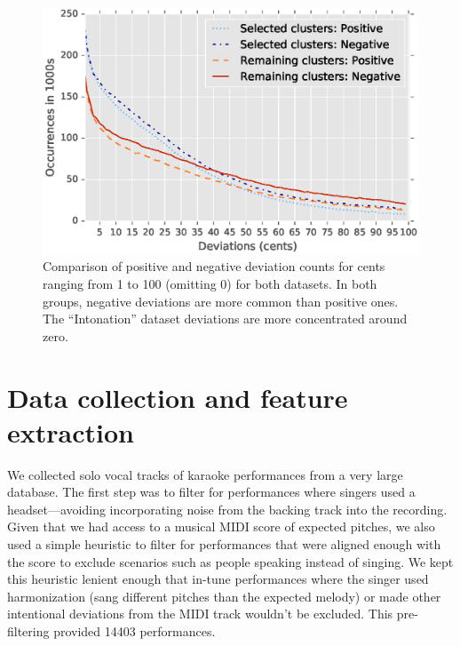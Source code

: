 \begin{figure}[h!]
    \centering
    \includegraphics[width=\textwidth]{figures/full_pos_vs_neg_line.eps}
    \caption{Comparison of positive and negative deviation counts for cents ranging from 1 to 100 (omitting 0) for both datasets. In both groups, negative deviations are more common than positive ones. The ``Intonation'' dataset deviations are more concentrated around zero. }
    \label{fig:pos_neg}
\end{figure}

\section{Data collection and feature extraction}
\label{sec:features}
We collected solo vocal tracks of karaoke performances from a very large database. The first step was to filter for performances where singers used a headset---avoiding incorporating noise from the backing track into the recording. Given that we had access to a musical MIDI score of expected pitches, we also used a simple heuristic to filter for performances that were aligned enough with the score to exclude scenarios such as people speaking instead of singing. We kept this heuristic lenient enough that in-tune performances where the singer used harmonization (sang different pitches than the expected melody) or made other intentional deviations from the MIDI track wouldn't be excluded. This pre-filtering provided 14403 performances. 

